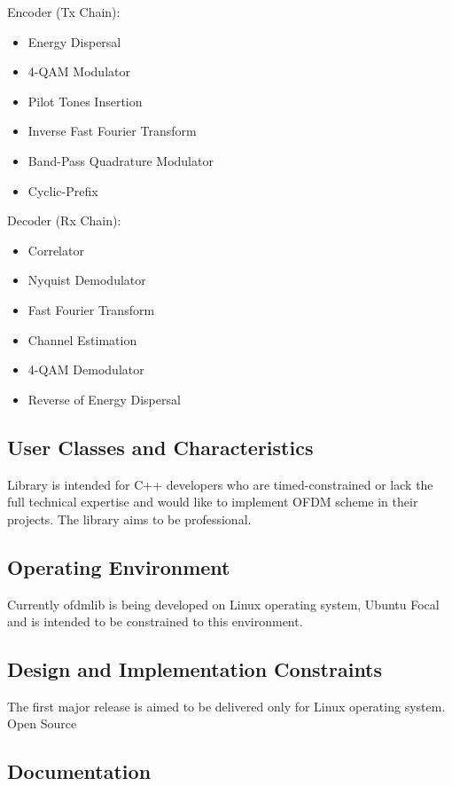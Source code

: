 \documentclass[]{report}
\begin{document}
Encoder (Tx Chain):

\begin{itemize}
	\item Energy Dispersal
	\item 4-QAM Modulator
	\item Pilot Tones Insertion
	\item Inverse Fast Fourier Transform
	\item Band-Pass Quadrature Modulator
	\item Cyclic-Prefix
\end{itemize}


Decoder (Rx Chain):

\begin{itemize}
	\item Correlator 
	\item Nyquist Demodulator
	\item Fast Fourier Transform
	\item Channel Estimation
	\item 4-QAM Demodulator
	\item Reverse of Energy Dispersal
\end{itemize}


\subsection{User Classes and Characteristics}

Library is intended for C++ developers who are timed-constrained or lack the full technical expertise and would like to implement OFDM scheme in their projects. The library aims to be professional.


\subsection{Operating Environment}

Currently ofdmlib is being developed on Linux operating system, Ubuntu Focal and is intended to be constrained to this environment.

\subsection{Design and Implementation Constraints}

The first major release is aimed to be delivered only for Linux operating system. 
Open Source

\subsection{Documentation}
\end{document}
